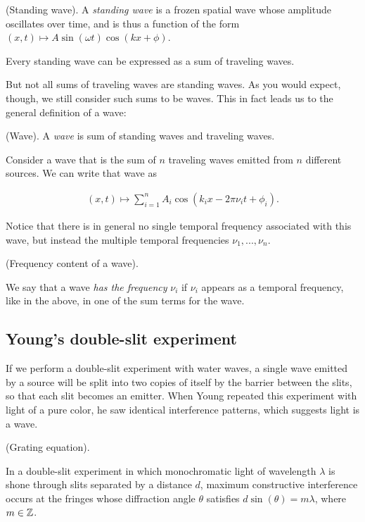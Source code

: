 \documentclass{article}
\begin{document}
\begin{defn}
	(Standing wave). A \textit{standing wave} is a frozen spatial wave whose amplitude oscillates over time, and is thus a function of the form $(x, t) \mapsto A \sin(\omega t) \cos(kx + \phi)$. 
\end{defn}

\begin{theorem}
	Every standing wave can be expressed as a sum of traveling waves.
\end{theorem}

But not all sums of traveling waves are standing waves. As you would expect, though, we still consider such sums to be waves. This in fact leads us to the general definition of a wave:

\begin{defn}
	(Wave). A \textit{wave} is sum of standing waves and traveling waves.
\end{defn}

Consider a wave that is the sum of $n$ traveling waves emitted from $n$ different sources. We can write that wave as

\begin{align*}
	(x, t) \mapsto \sum_{i = 1}^n A_i \cos(k_i x - 2\pi \nu_i t + \phi_i).
\end{align*}

Notice that there is in general no single temporal frequency associated with this wave, but instead the multiple temporal frequencies $\nu_1, ..., \nu_n$. 

\begin{defn}
	(Frequency content of a wave).
	
	We say that a wave \textit{has the frequency} $\nu_i$ if $\nu_i$ appears as a temporal frequency, like in the above, in one of the sum terms for the wave. 
\end{defn}

\subsection*{Young's double-slit experiment}

If we perform a double-slit experiment with water waves, a single wave emitted by a source will be split into two copies of itself by the barrier between the slits, so that each slit becomes an emitter. When Young repeated this experiment with light of a pure color, he saw identical interference patterns, which suggests light is a wave.

\begin{theorem}
	(Grating equation).
	
	In a double-slit experiment in which monochromatic light of wavelength $\lambda$ is shone through slits separated by a distance $d$, maximum constructive interference occurs at the fringes whose diffraction angle $\theta$ satisfies $d \sin(\theta) = m \lambda$, where $m \in \mathbb{Z}$.
\end{theorem}
\end{document}

